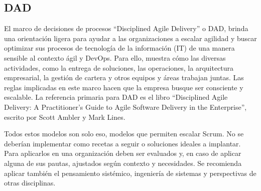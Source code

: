 \subsection{DAD}

El marco de decisiones de procesos “Disciplined Agile Delivery” o DAD, brinda una orientación ligera para ayudar a las organizaciones a escalar agilidad y buscar optimizar sus procesos de tecnología de la información (IT) de una manera sensible al contexto ágil y DevOps. Para ello, muestra cómo las diversas actividades, como la entrega de soluciones, las operaciones, la arquitectura empresarial, la gestión de cartera y otros equipos y áreas trabajan juntas. Las reglas implicadas en este marco hacen que la empresa busque ser consciente y escalable. La referencia primaria para DAD es el libro “Disciplined Agile Delivery: A Practitioner's Guide to Agile Software Delivery in the Enterprise”,  escrito por Scott Ambler y Mark Lines.\newline
\newline

Todos estos modelos son solo eso, modelos que permiten escalar Scrum. No se deberían implementar como recetas a seguir o soluciones ideales a implantar. Para aplicarlos en una organización deben ser evaluados y, en caso de aplicar alguna de sus pautas, ajustados según contexto y necesidades. Se recomienda aplicar también el pensamiento sistémico, ingeniería de sistemas y perspectivas de otras disciplinas.

